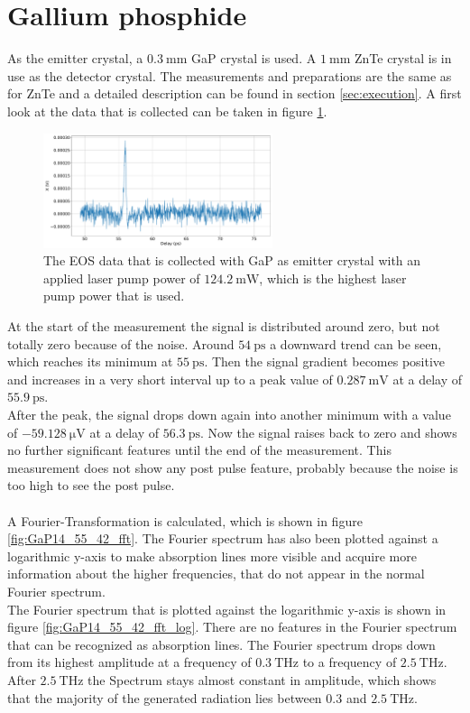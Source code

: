 \section{Gallium phosphide}
As the emitter crystal, a $\SI{0.3}{\milli\meter}$ GaP crystal is used.
A $\SI{1}{\milli\meter}$ ZnTe crystal is in use as the detector crystal.
The measurements and preparations are the same as for ZnTe and a detailed description can be found in section \ref{sec:execution}.
A first look at the data that is collected can be taken in figure \ref{fig:GaP14_55_42normalX}.
\\
\begin{figure}
    \centering
    \includegraphics[width=0.6\textwidth]{Plots/GaP14_55_42normalX.pdf}
    \caption{The EOS data that is collected with GaP as emitter crystal with an applied laser pump power of $\SI{124.2}{\milli\W}$, which is the highest laser pump power that is used.}
    \label{fig:GaP14_55_42normalX}
\end{figure}
At the start of the measurement the signal is distributed around zero, but not totally zero because of the noise.
Around $\SI{54}{\pico\second}$ a downward trend can be seen, which reaches its minimum at $\SI{55}{\pico\second}$.
Then the signal gradient becomes positive and increases in a very short interval up to a peak value of $\SI{0.287}{\milli\V}$ at a delay of $\SI{55.9}{\pico\second}$.
\\
After the peak, the signal drops down again into another minimum with a value of $\SI{-59.128}{\micro\V}$ at a delay of $\SI{56.3}{\pico\second}$.
Now the signal raises back to zero and shows no further significant features until the end of the measurement.
This measurement does not show any post pulse feature, probably because the noise is too high to see the post pulse.
\\\\
A Fourier-Transformation is calculated, which is shown in figure \ref{fig:GaP14_55_42_fft}.
The Fourier spectrum has also been plotted against a logarithmic y-axis to make absorption lines more visible and acquire more information about the higher frequencies, that do not appear in the normal Fourier spectrum.
\\
The Fourier spectrum that is plotted against the logarithmic y-axis is shown in figure \ref{fig:GaP14_55_42_fft_log}.
There are no features in the Fourier spectrum that can be recognized as absorption lines.
The Fourier spectrum drops down from its highest amplitude at a frequency of $\SI{0.3}{\tera\hertz}$ to a frequency of $\SI{2.5}{\tera\hertz}$.
After $\SI{2.5}{\tera\hertz}$ the Spectrum stays almost constant in amplitude, which shows that the majority of the generated radiation lies between $0.3$ and $\SI{2.5}{\tera\hertz}$.

